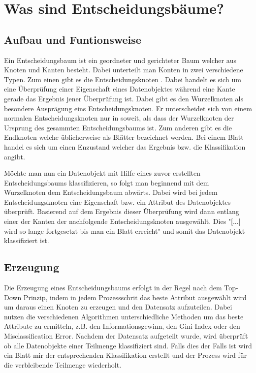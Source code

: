 \chapter{Was sind Entscheidungsbäume?}
\label{eb:was-sind-entscheidungsbaeume}

\section{Aufbau und Funtionsweise}
\label{eb:aufbau}
Ein Entscheidungsbaum ist ein geordneter und gerichteter \autocite{Entschei47:online} Baum welcher aus Knoten und Kanten besteht. Dabei unterteilt man Konten in zwei verschiedene Typen. Zum einen gibt es die Entscheidungsknoten \autocite{FramworkForSensitivity:online}. Dabei handelt es sich um eine Überprüfung einer Eigenschaft eines Datenobjektes \autocite{DataMining} während eine Kante gerade das Ergebnis jener Überprüfung ist. Dabei gibt es den Wurzelknoten als besondere Ausprägung eins Entscheidungsknoten. Er unterscheidet sich von einem normalen Entscheidungsknoten nur in soweit, als dass der Wurzelknoten der Ursprung des gesammten Entscheidungsbaums ist. Zum anderen gibt es die Endknoten \autocite{FramworkForSensitivity:online} welche üblicherweise als Blätter bezeichnet werden. Bei einem Blatt handel es sich um einen Enzustand welcher das Ergebnis bzw. die Klassifikation angibt. \autocite{Entschei47:online}

Möchte man nun ein Datenobjekt mit Hilfe eines zuvor erstellten Entscheidungsbaums klassifizieren, so folgt man beginnend mit dem Wurzelknoten dem Entscheidungsbaum abwärts. Dabei wird bei jedem Entscheidungsknoten eine Eigenschaft bzw. ein Attribut des Datenobjektes überprüft. Basierend auf dem Ergebnis dieser Überprüfung wird dann entlang einer der Kanten der nachfolgende Entscheidungsknoten ausgewählt. \autocite{Entschei47:online} Dies "[...] wird so lange fortgesetzt bis man ein Blatt erreicht" \autocite{Entschei47:online} und somit das Datenobjekt klassifiziert ist.

\section{Erzeugung}
\label{eb:erstellung}
Die Erzeugung eines Entscheidungsbaums erfolgt in der Regel nach dem Top-Down Prinzip, indem in jedem Prozessschrit das beste Attribut ausgewählt wird um daraus einen Knoten zu erzeugen und den Datensatz aufzuteilen. \autocite{TopDownInduction} Dabei nutzen die verschiedenen Algorithmen unterschiedliche Methoden um das beste Attribute zu ermitteln, z.B. den Informationsgewinn, den Gini-Index oder den Misclassification Error. \autocite{DataMining} Nachdem der Datensatz aufgeteilt wurde, wird überprüft ob alle Datenobjekte einer Teilmenge klassifiziert sind. Falls dies der Falls ist wird ein Blatt mir der entsprechenden Klassifikation erstellt und der Prozess wird für die verbleibende Teilmenge wiederholt. \autocite{SebastianManteyPruning:online}

